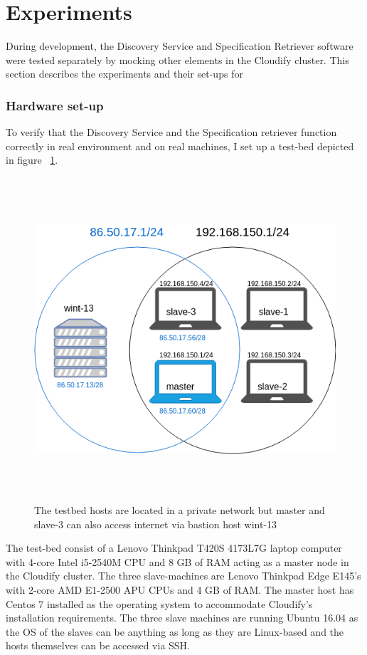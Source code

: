 \section{Experiments}

During development, the Discovery Service and Specification Retriever software were tested separately by mocking other elements in the Cloudify cluster. This section describes the experiments and their set-ups for 

\subsubsection{Hardware set-up}
To verify that the Discovery Service and the Specification retriever function correctly in real environment and on real machines, I set up a test-bed depicted in figure ~\ref{fig:network-venn}.

 \begin{figure}[ht!]
\centering
  \includegraphics[width=12cm,height=12cm, keepaspectratio]{Network-venn.png}%
  \caption{The testbed hosts are located in a private network but master and slave-3 can also access internet via bastion host wint-13}
  \label{fig:network-venn}
\end{figure}

The test-bed consist of a Lenovo Thinkpad T420S 4173L7G laptop computer with  4-core Intel i5-2540M CPU and 8 GB of RAM acting as a master node in the Cloudify cluster. The three slave-machines are Lenovo Thinkpad Edge E145's with 2-core AMD E1-2500 APU CPUs and 4 GB of RAM. The master host has Centos 7 installed as the operating system to accommodate Cloudify's installation requirements. The three slave machines are running Ubuntu 16.04 as the OS of the slaves can be anything as long as they are Linux-based and the hosts themselves can be accessed via SSH.

